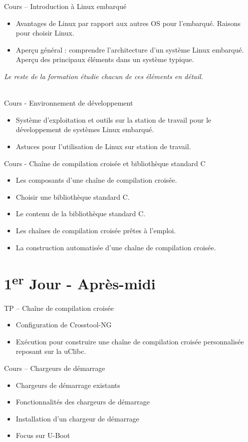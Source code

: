 \documentclass[a4paper,12pt,obeyspaces,spaces,hyphens]{article}
\begin{document}
\feagendaonecolumn
{Cours – Introduction à Linux embarqué}
{
  \begin{itemize}
  \item Avantages de Linux par rapport aux autres OS pour l'embarqué.
	Raisons pour choisir Linux.
  \item Aperçu général : comprendre l'architecture d'un système Linux
	embarqué. Aperçu des principaux éléments dans un système typique.
  \end{itemize}
  {\em Le reste de la formation étudie chacun de ces éléments en détail.}
}
\\
\feagendatwocolumn
{Cours - Environnement de développement}
{
  \begin{itemize}
  \item Système d'exploitation et outils sur la station de travail
	pour le développement de systèmes Linux embarqué.
  \item Astuces pour l'utilisation de Linux sur station de travail.
  \end{itemize}
}
{Cours - Chaîne de compilation croisée et bibliothèque standard C}
{
  \begin{itemize}
  \item Les composants d'une chaîne de compilation croisée.
  \item Choisir une bibliothèque standard C.
  \item Le contenu de la bibliothèque standard C.
  \item Les chaînes de compilation croisée prêtes à l'emploi.
  \item La construction automatisée d'une chaîne de compilation croisée.
  \end{itemize}
}

\section{1\textsuperscript{er} Jour - Après-midi}
\feagendatwocolumn
{TP – Chaîne de compilation croisée}
{
  \begin{itemize}
  \item Configuration de Crosstool-NG
  \item Exécution pour construire une chaîne de compilation croisée
	personnalisée reposant sur la uClibc.
  \end{itemize}
}
{Cours – Chargeurs de démarrage}
{
  \begin{itemize}
  \item Chargeurs de démarrage existants
  \item Fonctionnalités des chargeurs de démarrage
  \item Installation d'un chargeur de démarrage
  \item Focus sur U-Boot
  \end{itemize}
}
\\
\end{document}
